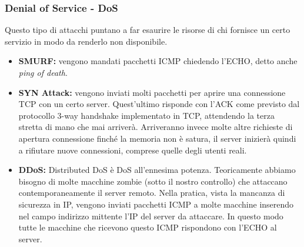 \documentclass[10pt,a4paper,twoside]{article}
\begin{document}
\subsubsection{Denial of Service - DoS}
Questo tipo di attacchi puntano a far esaurire le risorse di chi fornisce un certo servizio in modo da renderlo non disponibile.
\begin{itemize}
\item \textbf{SMURF:} vengono mandati pacchetti ICMP chiedendo l'ECHO, detto anche \textit{ping of death}.
\item \textbf{SYN Attack:} vengono inviati molti pacchetti per aprire una connessione TCP con un certo server. Quest'ultimo risponde con l'ACK come previsto dal protocollo 3-way handshake implementato in TCP, attendendo la terza stretta di mano che mai arriverà. Arriveranno invece molte altre richieste di apertura connessione finché la memoria non è satura, il server inizierà quindi a rifiutare nuove connessioni, comprese quelle degli utenti reali.
\item \textbf{DDoS:} Distributed DoS è DoS all'ennesima potenza. Teoricamente abbiamo bisogno di molte macchine zombie (sotto il nostro controllo) che attaccano contemporaneamente il server remoto. Nella pratica, vista la mancanza di sicurezza in IP, vengono inviati pacchetti ICMP a molte macchine inserendo nel campo indirizzo mittente l'IP del server da attaccare. In questo modo tutte le macchine che ricevono questo ICMP rispondono con l'ECHO al server.
\end{itemize}
\end{document}
